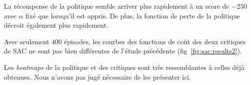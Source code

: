 La récompense de la politique semble arriver plus rapidement à un score de
\(-250\) avec \(\alpha\) fixé que lorsqu'il est appris. De plus, la fonction de
perte de la politique décroit également plus rapidement.

Avec seulement \(400\) épisodes, les courbes des fonctions de coût des deux
critiques de SAC ne sont pas bien différentes de l'étude précédente
(fig~\ref{fig:sac:results2}). 

Les \emph{heatmaps} de la politique et des
critiques sont très ressemblantes à celles déjà obtenues. Nous n'avons pas jugé
nécessaire de les présenter ici.
